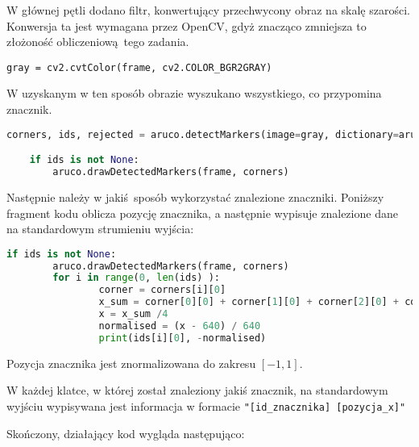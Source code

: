 W głównej pętli dodano filtr, konwertujący przechwycony obraz na skalę szarości. Konwersja ta jest
wymagana przez OpenCV, gdyż znacząco zmniejsza to złożoność obliczeniową tego zadania.
\begin{lstlisting}
gray = cv2.cvtColor(frame, cv2.COLOR_BGR2GRAY)
\end{lstlisting}

W uzyskanym w ten sposób obrazie wyszukano wszystkiego, co przypomina znacznik.

\begin{lstlisting}[language=Python]
    corners, ids, rejected = aruco.detectMarkers(image=gray, dictionary=aruco_dict, parameters=parameters)

    if ids is not None:
        aruco.drawDetectedMarkers(frame, corners)

\end{lstlisting}

Następnie należy w jakiś sposób wykorzystać znalezione znaczniki. Poniższy fragment kodu oblicza
pozycję znacznika, a następnie wypisuje znalezione dane na standardowym strumieniu wyjścia:

\begin{lstlisting}[language=Python]
    if ids is not None:
        aruco.drawDetectedMarkers(frame, corners)
        for i in range(0, len(ids) ):
                corner = corners[i][0]
                x_sum = corner[0][0] + corner[1][0] + corner[2][0] + corner[3][0]
                x = x_sum /4
                normalised = (x - 640) / 640
                print(ids[i][0], -normalised)
\end{lstlisting}

Pozycja znacznika jest znormalizowana do zakresu $[-1, 1]$.

W każdej klatce, w której został znaleziony jakiś znacznik, na standardowym wyjściu wypisywana
jest informacja w formacie \verb`"[id_znacznika] [pozycja_x]"`

Skończony, działający kod wygląda następująco:


